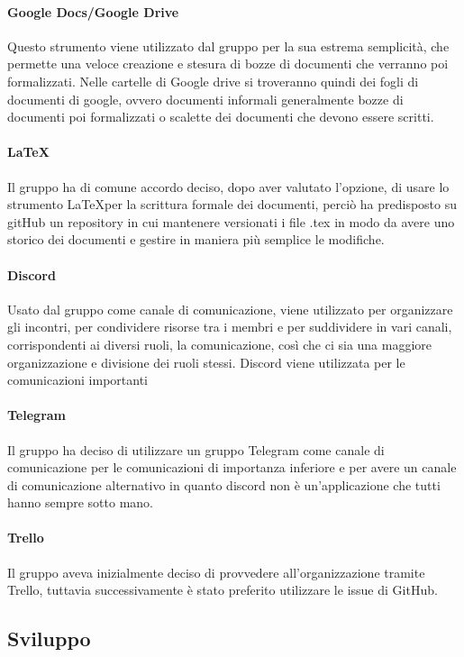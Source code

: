 \documentclass[../norme_di_progetto.tex]{subfiles}
\begin{document}
\paragraph{Google Docs/Google Drive}
Questo strumento viene utilizzato dal gruppo per la sua estrema semplicità, che permette una veloce creazione e stesura di bozze di documenti che verranno poi formalizzati. Nelle cartelle di Google drive si troveranno quindi dei fogli di documenti di google, ovvero documenti informali generalmente bozze di documenti poi formalizzati o scalette dei documenti che devono essere scritti.

\paragraph{\LaTeX}
Il gruppo ha di comune accordo deciso, dopo aver valutato l'opzione, di usare lo strumento \LaTeX per la scrittura formale dei documenti, perciò ha predisposto su gitHub un repository in cui mantenere versionati i file .tex in modo da avere uno storico dei documenti e gestire in maniera più semplice le modifiche.

\paragraph{Discord}
Usato dal gruppo come canale di comunicazione, viene utilizzato per organizzare gli incontri, per condividere risorse tra i membri e per suddividere in vari canali, corrispondenti ai diversi ruoli, la comunicazione, così che ci sia una maggiore organizzazione e divisione dei ruoli stessi. Discord viene utilizzata per le comunicazioni importanti

\paragraph{Telegram}
Il gruppo ha deciso di utilizzare un gruppo Telegram come canale di comunicazione per le comunicazioni di importanza inferiore e per avere un canale di comunicazione alternativo in quanto discord non è un'applicazione che tutti hanno sempre sotto mano.

\paragraph{Trello}
Il gruppo aveva inizialmente deciso di provvedere all'organizzazione tramite Trello, tuttavia successivamente è stato preferito utilizzare le issue di GitHub.

\subsection{Sviluppo}
\end{document}
